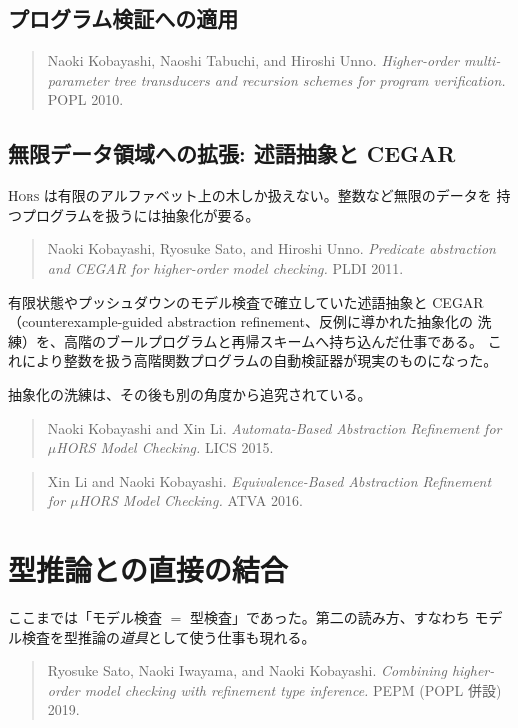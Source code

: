 \documentclass[11pt,a4paper]{ltjsarticle}
\newcommand{\HORS}{\textsc{Hors}}
\begin{document}
\subsection{プログラム検証への適用}

\begin{quote}
Naoki Kobayashi, Naoshi Tabuchi, and Hiroshi Unno.
\emph{Higher-order multi-parameter tree transducers and recursion schemes
for program verification.}
POPL 2010.
\end{quote}

\subsection{無限データ領域への拡張: 述語抽象と CEGAR}

\HORS{} は有限のアルファベット上の木しか扱えない。整数など無限のデータを
持つプログラムを扱うには抽象化が要る。

\begin{quote}
Naoki Kobayashi, Ryosuke Sato, and Hiroshi Unno.
\emph{Predicate abstraction and CEGAR for higher-order model checking.}
PLDI 2011.
\end{quote}

有限状態やプッシュダウンのモデル検査で確立していた述語抽象と
CEGAR（counterexample-guided abstraction refinement、反例に導かれた抽象化の
洗練）を、高階のブールプログラムと再帰スキームへ持ち込んだ仕事である。
これにより整数を扱う高階関数プログラムの自動検証器が現実のものになった。

抽象化の洗練は、その後も別の角度から追究されている。

\begin{quote}
Naoki Kobayashi and Xin Li.
\emph{Automata-Based Abstraction Refinement for $\mu$HORS Model Checking.}
LICS 2015.
\end{quote}

\begin{quote}
Xin Li and Naoki Kobayashi.
\emph{Equivalence-Based Abstraction Refinement for $\mu$HORS Model Checking.}
ATVA 2016.
\end{quote}

\section{型推論との直接の結合}

ここまでは「モデル検査 $=$ 型検査」であった。第二の読み方、すなわち
モデル検査を型推論の\emph{道具}として使う仕事も現れる。

\begin{quote}
Ryosuke Sato, Naoki Iwayama, and Naoki Kobayashi.
\emph{Combining higher-order model checking with refinement type inference.}
PEPM (POPL 併設) 2019.
\end{quote}
\end{document}
